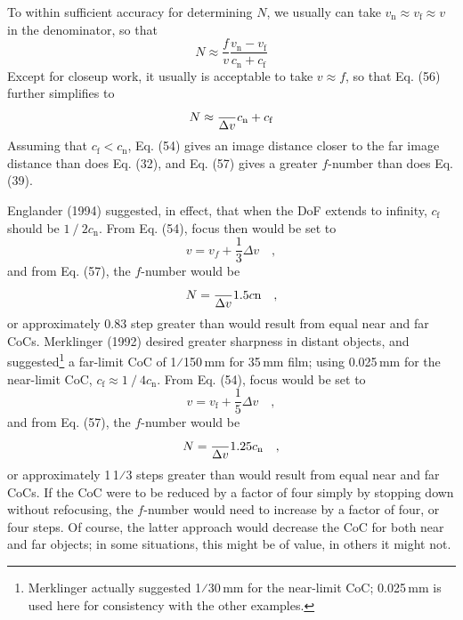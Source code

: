 \documentclass[11pt, oneside]{scrartcl}   	%
\newcommand{\Dv}{\ensuremath{\Delta v}}
\begin{document}
To within sufficient accuracy for determining $N$, we usually can take $v_\mathrm{n} \approx v_\mathrm{f} \approx v$ in the denominator, so that
\begin{equation}
   N\approx\frac f v \frac{v_\mathrm{n}-v_\mathrm{f}}{c_\mathrm{n}+c_\mathrm{f}}
   \label{eq:56}
\end{equation}
Except for closeup work, it usually is acceptable to take $v \approx f$, so that Eq. (56) further simplifies to
\begin{equation}
   N\approx\frac \Dv{c_\mathrm{n}+c_\mathrm{f}}
   \label{eq:57}
\end{equation}
Assuming that $c_\mathrm{f} < c_\mathrm{n}$, Eq. (54) gives an image distance closer to the far image distance than does Eq. (32), and Eq. (57) gives a greater $f$-number than does Eq. (39).

Englander (1994) suggested, in effect, that when the DoF extends to infinity, $c_\mathrm{f}$ should be $1⁄2 c_\mathrm{n}$. From Eq. (54), focus then would be set to
\begin{equation}
  v = v_f + \frac 1 3 \Dv\quad,
  \label{eq:57+}
\end{equation}
and from Eq. (57), the $f$-number would be
\begin{equation}
  N = \frac\Dv{1.5c\mathrm{n}}\quad,
  \label{eq:57++}
\end{equation}
or approximately 0.83 step greater than would result from equal near
and far CoCs. Merklinger (1992) desired greater sharpness in distant
objects, and suggested\footnote{Merklinger actually suggested 1⁄30\,mm
  for the near-limit CoC; 0.025\,mm is used here for consistency with
  the other examples.} a far-limit CoC of 1⁄150\,mm for 35\,mm film;
using 0.025\,mm for the near-limit CoC, $c_\mathrm{f} \approx 1⁄4 c_\mathrm{n}$. From
Eq. (54), focus would be set to
\begin{equation}
  \label{eq:57+++}
  v=v_\mathrm{f}+\frac15\Dv\quad,
\end{equation}
and from Eq. (57), the $f$-number would be
\begin{equation}
  \label{eq:57++++}
  N=\frac \Dv{1.25c_\mathrm{n}}\quad ,
\end{equation}
or approximately 1\,1⁄3 steps greater than would result from equal near and far CoCs. If the CoC were to be reduced by a factor of four simply by stopping down without refocusing, the $f$-number would need to increase by a factor of four, or four steps. Of course, the latter approach would decrease the CoC for both near and far objects; in some situations, this might be of value, in others it might not.
\end{document}
